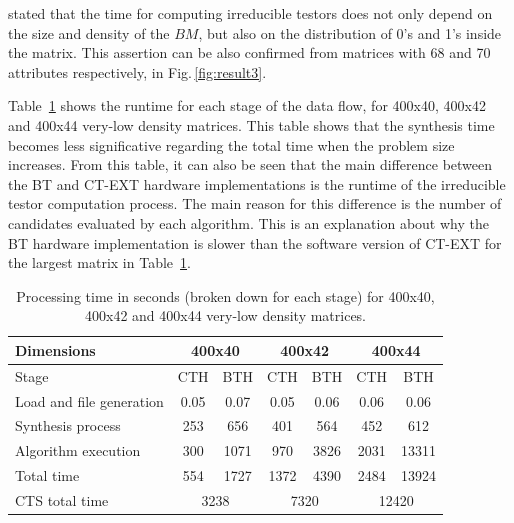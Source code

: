 \documentclass[authoryear,preprint,review,12pt]{elsarticle}
\begin{document}
\cite{R21} stated that the time for computing irreducible testors does not only depend on the size and 
density of the $BM$, but also on the distribution of 0's and 1's inside the matrix. This assertion can 
be also confirmed from matrices with 68 and 70 attributes respectively, in Fig.\,\ref{fig:result3}.

Table~\ref{table:8} shows the runtime for each stage of the data flow, for 
400x40, 400x42 and 400x44 very-low density matrices. This table shows that the synthesis time 
becomes less significative regarding the total time when the problem size increases. 
From this table, it can also be seen that the main difference between the BT and CT-EXT hardware 
implementations is the runtime of the irreducible testor computation process. The main reason for 
this difference is the number of candidates evaluated by each algorithm. This is an explanation 
about why the BT hardware implementation is slower than the software version of CT-EXT for the 
largest matrix in Table~\ref{table:8}.


\begin{table}[htb]
\caption{Processing time in seconds (broken down for each stage) for 
400x40, 400x42 and 400x44 very-low density matrices.} \label{table:8}
\begin{center}
    \begin{tabular}{lcccccc}   \hline
    	   Dimensions                & \multicolumn{2}{c}{400x40} & \multicolumn{2}{c}{400x42} 
    	                             & \multicolumn{2}{c}{400x44} \\ \hline
    	    	Stage	        			& CTH & BTH	& CTH & BTH & CTH & BTH \\ \hline
    	    Load and file generation & 0.05& 0.07& 0.05& 0.06& 0.06& 0.06\\
    	    Synthesis process        & 253 & 656 & 401 & 564 & 452 & 612\\
    	    Algorithm execution      & 300 & 1071& 970 & 3826& 2031& 13311\\ \hline
    	    Total time               & 554 & 1727& 1372& 4390& 2484& 13924\\ \hline
    	    CTS total time               & \multicolumn{2}{c}{3238} & \multicolumn{2}{c}{7320} 
    	    								& \multicolumn{2}{c}{12420}\\ \hline
    	    
    \end{tabular}
\end{center}
\end{table}
\end{document}
